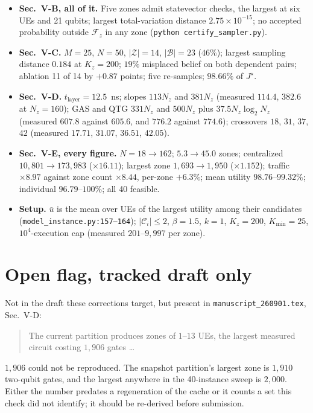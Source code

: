 \documentclass[10pt]{article}
\begin{document}
\begin{itemize}\itemsep2pt
  \item \textbf{Sec.~V-B, all of it.} Five zones admit statevector checks,
        the largest at six UEs and 21 qubits; largest total-variation
        distance $2.75\times10^{-15}$; no accepted probability outside
        $\mathcal F_z$ in any zone (\texttt{python certify\_sampler.py}).
  \item \textbf{Sec.~V-C.} $M=25$, $N=50$, $|\mathcal Z|=14$,
        $|\mathcal B|=23$ ($46\%$); largest sampling distance $0.184$ at
        $K_z=200$; $19\%$ misplaced belief on both dependent pairs;
        ablation 11 of 14 by $+0.87$ points; five re-samples; $98.66\%$ of
        $J^\star$.
  \item \textbf{Sec.~V-D.} $t_{\mathrm{layer}}=12.5$~ns; slopes $113N_z$
        and $381N_z$ (measured $114.4$, $382.6$ at $N_z=160$); GAS and QTG
        $331N_z$ and $500N_z$ plus $37.5N_z\log_2 N_z$ (measured $607.8$
        against $605.6$, and $776.2$ against $774.6$); crossovers $18$,
        $31$, $37$, $42$ (measured $17.71$, $31.07$, $36.51$, $42.05$).
  \item \textbf{Sec.~V-E, every figure.} $N=18\rightarrow162$;
        $5.3\rightarrow45.0$ zones; centralized
        $10{,}801\rightarrow173{,}983$ ($\times16.11$); largest zone
        $1{,}693\rightarrow1{,}950$ ($\times1.152$); traffic $\times8.97$
        against zone count $\times8.44$, per-zone $+6.3\%$; mean utility
        $98.76$--$99.32\%$; individual $96.79$--$100\%$; all 40 feasible.
  \item \textbf{Setup.} $\bar u$ is the mean over UEs of the largest
        utility among their candidates
        (\texttt{model\_instance.py:157--164}); $|\mathcal C_i|\le2$,
        $\beta=1.5$, $k=1$, $K_z=200$, $K_{\min}=25$, $10^4$-execution cap
        (measured $201$--$9{,}997$ per zone).
\end{itemize}

\section*{Open flag, tracked draft only}

Not in the draft these corrections target, but present in
\texttt{manuscript\_260901.tex}, Sec.~V-D:

\begin{quote}
The current partition produces zones of $1$--$13$ UEs, the largest measured
circuit costing $1{,}906$ gates \ldots
\end{quote}

\noindent $1{,}906$ could not be reproduced. The snapshot partition's
largest zone is $1{,}910$ two-qubit gates, and the largest anywhere in the
40-instance sweep is $2{,}000$. Either the number predates a regeneration
of the cache or it counts a set this check did not identify; it should be
re-derived before submission.
\end{document}
